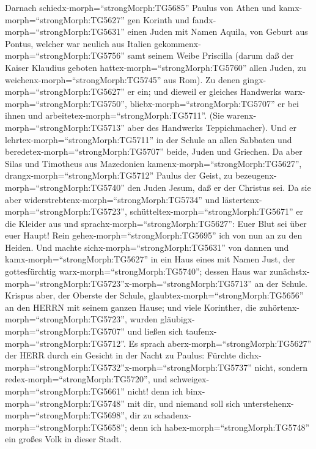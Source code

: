  Darnach schiedx-morph=``strongMorph:TG5685'' Paulus von
Athen und kamx-morph=``strongMorph:TG5627'' gen Korinth  und
fandx-morph=``strongMorph:TG5631'' einen Juden mit Namen Aquila, von
Geburt aus Pontus, welcher war neulich aus Italien
gekommenx-morph=``strongMorph:TG5756'' samt seinem Weibe Priscilla
(darum daß der Kaiser Klaudius geboten
hattex-morph=``strongMorph:TG5760'' allen Juden, zu
weichenx-morph=``strongMorph:TG5745'' aus Rom).  Zu denen
gingx-morph=``strongMorph:TG5627'' er ein; und dieweil er gleiches
Handwerks warx-morph=``strongMorph:TG5750'',
bliebx-morph=``strongMorph:TG5707'' er bei ihnen und
arbeitetex-morph=``strongMorph:TG5711''. (Sie
warenx-morph=``strongMorph:TG5713'' aber des Handwerks Teppichmacher).
 Und er lehrtex-morph=``strongMorph:TG5711'' in der Schule
an allen Sabbaten und beredetex-morph=``strongMorph:TG5707'' beide,
Juden und Griechen.  Da aber Silas und Timotheus aus
Mazedonien kamenx-morph=``strongMorph:TG5627'',
drangx-morph=``strongMorph:TG5712'' Paulus der Geist, zu
bezeugenx-morph=``strongMorph:TG5740'' den Juden Jesum, daß er der
Christus sei.  Da sie aber
widerstrebtenx-morph=``strongMorph:TG5734'' und
lästertenx-morph=``strongMorph:TG5723'',
schütteltex-morph=``strongMorph:TG5671'' er die Kleider aus und
sprachx-morph=``strongMorph:TG5627'': Euer Blut sei über euer Haupt!
Rein gehex-morph=``strongMorph:TG5695'' ich von nun an zu den Heiden.
 Und machte sichx-morph=``strongMorph:TG5631'' von dannen
und kamx-morph=``strongMorph:TG5627'' in ein Haus eines mit Namen Just,
der gottesfürchtig warx-morph=``strongMorph:TG5740''; dessen Haus war
zunächstx-morph=``strongMorph:TG5723''x-morph=``strongMorph:TG5713'' an
der Schule.  Krispus aber, der Oberste der Schule,
glaubtex-morph=``strongMorph:TG5656'' an den HERRN mit seinem ganzen
Hause; und viele Korinther, die zuhörtenx-morph=``strongMorph:TG5723'',
wurden gläubigx-morph=``strongMorph:TG5707'' und ließen sich
taufenx-morph=``strongMorph:TG5712''.  Es sprach
aberx-morph=``strongMorph:TG5627'' der HERR durch ein Gesicht in der
Nacht zu Paulus: Fürchte
dichx-morph=``strongMorph:TG5732''\textbar x-morph=``strongMorph:TG5737''
nicht, sondern redex-morph=``strongMorph:TG5720'', und
schweigex-morph=``strongMorph:TG5661'' nicht!  denn ich
binx-morph=``strongMorph:TG5748'' mit dir, und niemand soll sich
unterstehenx-morph=``strongMorph:TG5698'', dir zu
schadenx-morph=``strongMorph:TG5658''; denn ich
habex-morph=``strongMorph:TG5748'' ein großes Volk in dieser Stadt.
